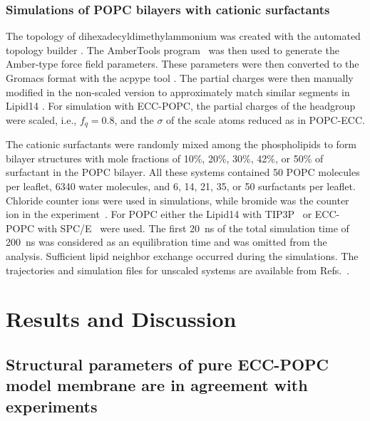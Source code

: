 \documentclass[aip,jcp,twocolumn]{revtex4}
\begin{document}
\subsubsection{Simulations of POPC bilayers with cationic surfactants}
The topology of dihexadecyldimethylammonium was created with the automated topology builder \cite{malde11}. The AmberTools program~\cite{amber} was then used to generate the Amber-type force field parameters. These parameters were then converted to the Gromacs format with the acpype tool \cite{acpype}. The partial charges were then manually modified in the non-scaled version to approximately match similar segments in Lipid14 \cite{dickson14}. For simulation with ECC-POPC, the partial charges of the headgroup were scaled, i.e., $f_q=0.8$, and the $\sigma$ of the scale atoms reduced as in POPC-ECC.

The cationic surfactants were randomly mixed among the phospholipids to form bilayer structures with mole fractions of 10\%, 20\%, 30\%, 42\%, or 50\% of surfactant in the POPC bilayer. All these systems contained 50 POPC molecules per leaflet, 6340 water molecules, and 6, 14, 21, 35, or 50 surfactants per leaflet.  Chloride counter ions were used in simulations, while bromide was the counter ion in the experiment~\cite{scherer89}. For POPC either the Lipid14 with TIP3P~\cite{jorgensen83} or ECC-POPC with SPC/E~\cite{Berendsen1987}  were used. The first 20~ns of the total simulation time of 200~ns was considered as an equilibration time and was omitted from the analysis. Sufficient lipid neighbor exchange occurred during the simulations.
The trajectories and simulation files for unscaled systems are available from
Refs.~.


\section{Results and Discussion}

\subsection{Structural parameters of pure ECC-POPC model membrane are in agreement with experiments}
\end{document}
